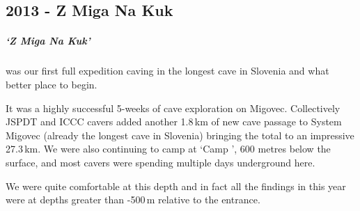 \begin{tcolorbox}
	\chapter{2013 - Z Miga Na Kuk}
	\paragraph{`Z Miga Na Kuk'} was our first full expedition caving in the longest cave in Slovenia and what better place to begin. 

It was a highly successful 5-weeks of cave exploration on Migovec. Collectively JSPDT and ICCC cavers added another 1.8\,km of new cave passage to System Migovec (already the longest cave in Slovenia) bringing the total to an impressive 27.3\,km. We were also continuing to camp at `Camp \protect{}', 600 metres below the surface, and most cavers were spending multiple days underground here. 

We were quite comfortable at this depth and in fact all the findings in  this year were at depths greater than -500\,m relative to the entrance.

\end{tcolorbox}
\BgThispage
